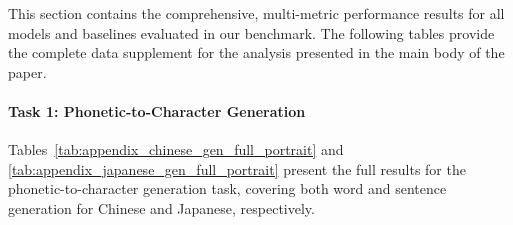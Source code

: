 \documentclass[10pt, a4paper]{article}
\begin{document}
This section contains the comprehensive, multi-metric performance results for all models and baselines evaluated in our benchmark. The following tables provide the complete data supplement for the analysis presented in the main body of the paper.

\paragraph{Task 1: Phonetic-to-Character Generation}

Tables~\ref{tab:appendix_chinese_gen_full_portrait} and \ref{tab:appendix_japanese_gen_full_portrait} present the full results for the phonetic-to-character generation task, covering both word and sentence generation for Chinese and Japanese, respectively.

\end{document}
